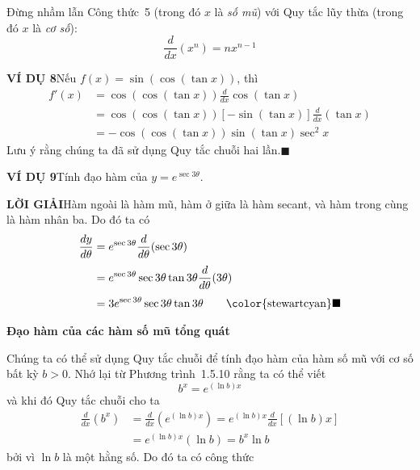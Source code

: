 \noindent
\begin{minipage}[t]{0.26\textwidth}
\vspace*{14.8cm}
\begin{flushleft}
\footnotesize
Đừng nhầm lẫn Công thức~5 (trong đó $x$ là \textit{số mũ}) với Quy tắc lũy thừa (trong đó $x$ là \textit{cơ số}):
\vspace{-1mm}
\[
\frac{d}{dx}(x^n) = n x^{n-1}
\]
\end{flushleft}
\end{minipage}%
\hfill
\begin{minipage}[t]{0.70\textwidth}

\noindent\textbf{\textsf{\textcolor{stewartcyan}{VÍ DỤ 8}}}\quad Nếu $f(x) = \sin(\cos(\tan x))$, thì
\begin{align*}
f'(x) &= \cos(\cos(\tan x)) \frac{d}{dx} \cos(\tan x) \\[3pt]
&= \cos(\cos(\tan x)) [-\sin(\tan x)] \frac{d}{dx} (\tan x) \\[3pt]
&= -\cos(\cos(\tan x)) \sin(\tan x) \sec^2 x
\end{align*}
Lưu ý rằng chúng ta đã sử dụng Quy tắc chuỗi hai lần.\hfill{\color{stewartcyan}$\blacksquare$}

\vspace{0.4cm}
\noindent\textbf{\textsf{\textcolor{stewartcyan}{VÍ DỤ 9}}}\quad Tính đạo hàm của $y = e^{\sec 3\theta}$.

\vspace{0.15cm}
\noindent\textbf{\textsf{\textcolor{stewartcyan}{LỜI GIẢI}}}\quad Hàm ngoài là hàm mũ, hàm ở giữa là hàm secant, và hàm trong cùng là hàm nhân ba. Do đó ta có
\begin{align*}
\frac{dy}{d\theta} &= e^{\sec 3\theta} \frac{d}{d\theta}(\sec 3\theta) \\[3pt]
&= e^{\sec 3\theta} \sec 3\theta \tan 3\theta \frac{d}{d\theta}(3\theta) \\[3pt]
&= 3e^{\sec 3\theta} \sec 3\theta \tan 3\theta \tag*{{\color{stewartcyan}$\blacksquare$}}
\end{align*}

\vspace{0.4cm}
\noindent{\color{stewartcyan}\rule{1.15ex}{1.15ex}}\quad\textbf{\textsf{\large Đạo hàm của các hàm số mũ tổng quát}}

\vspace{0.2cm}
Chúng ta có thể sử dụng Quy tắc chuỗi để tính đạo hàm của hàm số mũ với cơ số bất kỳ $b > 0$. Nhớ lại từ Phương trình~1.5.10 rằng ta có thể viết
\[
b^x = e^{(\ln b)x}
\]
và khi đó Quy tắc chuỗi cho ta
\begin{align*}
\frac{d}{dx}(b^x) &= \frac{d}{dx}\left(e^{(\ln b)x}\right) = e^{(\ln b)x} \frac{d}{dx}[(\ln b)x] \\[3pt]
&= e^{(\ln b)x}(\ln b) = b^x \ln b
\end{align*}
bởi vì $\ln b$ là một hằng số. Do đó ta có công thức


\end{minipage}
